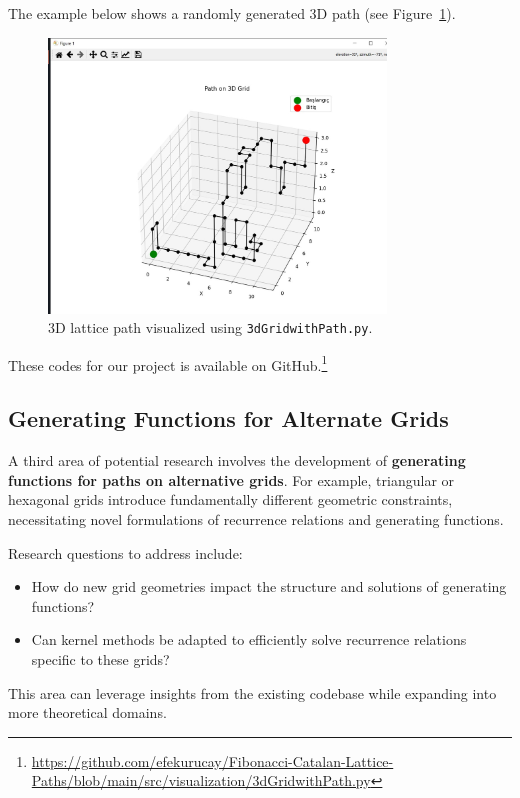 \documentclass{article}
\begin{document}
The example below shows a randomly generated 3D path (see Figure~\ref{fig:3d-path}).

\begin{figure}[H]
    \centering
    \includegraphics[width=0.8\textwidth]{images/3dpath.jpg}
    \caption{3D lattice path visualized using \texttt{3dGridwithPath.py}.}
    \label{fig:3d-path}
\end{figure}

These codes for our project is available on GitHub.\footnote{\url{https://github.com/efekurucay/Fibonacci-Catalan-Lattice-Paths/blob/main/src/visualization/3dGridwithPath.py}}



\subsection{Generating Functions for Alternate Grids}
A third area of potential research involves the development of \textbf{generating functions for paths on alternative grids}. For example, triangular or hexagonal grids introduce fundamentally different geometric constraints, necessitating novel formulations of recurrence relations and generating functions.

Research questions to address include:
\begin{itemize}
    \item How do new grid geometries impact the structure and solutions of generating functions?
    \item Can kernel methods be adapted to efficiently solve recurrence relations specific to these grids?
\end{itemize}

This area can leverage insights from the existing codebase while expanding into more theoretical domains.
\end{document}
